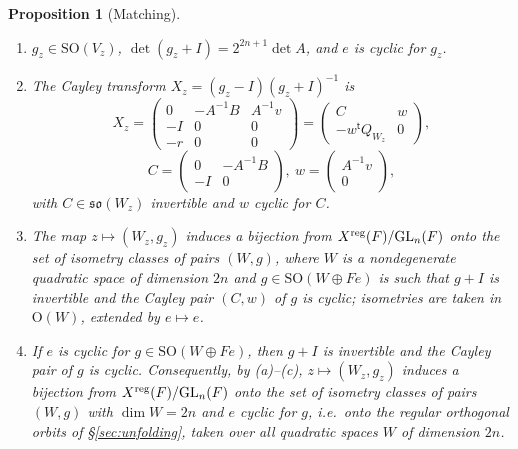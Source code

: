 \documentclass[11pt,oneside,notitlepage]{book}
\numberwithin{equation}{section}
\theoremstyle{plain}
\newtheorem{proposition}[theorem]{Proposition}
\theoremstyle{definition}
\newcommand{\GL}{\mathrm{GL}}
\newcommand{\SO}{\mathrm{SO}}
\newcommand{\Ort}{\mathrm{O}}
\newcommand{\so}{\mathfrak{so}}
\begin{document}
\begin{proposition}[Matching]\label{prop:matching}
	\begin{enumerate}[label=(\alph*)]
		\item $g_z\in\SO(V_z)$, $\det(g_z+I)=2^{2n+1}\det A$, and $e$ is cyclic for $g_z$.
		\item The Cayley transform $X_z=(g_z-I)(g_z+I)^{-1}$ is
		\[X_z=\begin{pmatrix}0&-A^{-1}B&A^{-1}v\\-I&0&0\\-r&0&0\end{pmatrix}=\begin{pmatrix}C&w\\-w^{\mathsf t}Q_{W_z}&0\end{pmatrix},\]\[C=\begin{pmatrix}0&-A^{-1}B\\-I&0\end{pmatrix},\ w=\begin{pmatrix}A^{-1}v\\0\end{pmatrix},\]
		with $C\in\so(W_z)$ invertible and $w$ cyclic for $C$.
\item The map $z\mapsto(W_z,g_z)$ induces a bijection from $X^{\rm reg}(F)/\GL_n(F)$ onto the set of isometry classes of pairs $(W,g)$, where $W$ is a nondegenerate quadratic space of dimension $2n$ and $g\in\SO(W\oplus Fe)$ is such that $g+I$ is invertible and the Cayley pair $(C,w)$ of $g$ is cyclic; isometries are taken in $\Ort(W)$, extended by $e\mapsto e$.
\item If $e$ is cyclic for $g\in\SO(W\oplus Fe)$, then $g+I$ is invertible and the Cayley pair of $g$ is cyclic. Consequently, by (a)--(c), $z\mapsto(W_z,g_z)$ induces a bijection from $X^{\rm reg}(F)/\GL_n(F)$ onto the set of isometry classes of pairs $(W,g)$ with $\dim W=2n$ and $e$ cyclic for $g$, i.e.\ onto the regular orthogonal orbits of \S\ref{sec:unfolding}, taken over all quadratic spaces $W$ of dimension $2n$.
\end{enumerate}
\end{proposition}
\end{document}
